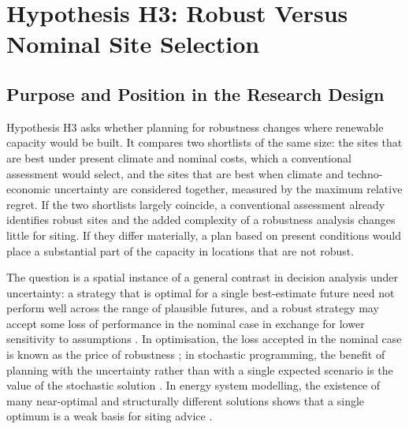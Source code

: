 
\section{Hypothesis H3: Robust Versus Nominal Site Selection}
\label{sec:h3}

\subsection{Purpose and Position in the Research Design}
\label{subsec:h3_purpose}

Hypothesis H3 asks whether planning for robustness changes where renewable
capacity would be built. It compares two shortlists of the same size: the sites
that are best under present climate and nominal costs, which a conventional
assessment would select, and the sites that are best when climate and
techno-economic uncertainty are considered together, measured by the maximum
relative regret. If the two shortlists largely coincide, a conventional
assessment already identifies robust sites and the added complexity of a
robustness analysis changes little for siting. If they differ materially, a plan
based on present conditions would place a substantial part of the capacity in
locations that are not robust.

The question is a spatial instance of a general contrast in decision analysis
under uncertainty: a strategy that is optimal for a single best-estimate future
need not perform well across the range of plausible futures, and a robust
strategy may accept some loss of performance in the nominal case in exchange
for lower sensitivity to assumptions
\cite{lempert2003,lempertcollins2007}. In optimisation, the loss accepted in the
nominal case is known as the price of robustness \cite{bertsimassim2004}; in
stochastic programming, the benefit of planning with the uncertainty rather than
with a single expected scenario is the value of the stochastic solution
\cite{birge1982}. In energy system modelling, the existence of many
near-optimal and structurally different solutions shows that a single optimum
is a weak basis for siting advice \cite{decarolis2011,neumannbrown2021}.

